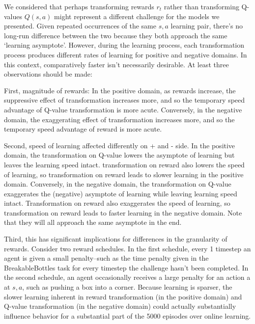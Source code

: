 
We considered that perhaps transforming rewards $r_t$ rather than transforming Q-values $Q(s, a)$ might represent a different challenge for the models we presented. Given repeated occurrences of the same $s, a$ learning pair, there's no long-run difference between the two because they both approach the same `learning asymptote'. However, during the learning process, each transformation process produces different rates of learning for positive and negative domains. In this context, comparatively faster isn't necessarily desirable. At least three observations should be made:

First, magnitude of rewards: In the positive domain, as rewards increase, the suppressive effect of transformation increases more, and so the temporary speed advantage of Q-value transformation is more acute. Conversely, in the negative domain, the exaggerating effect of transformation increases more, and so the temporary speed advantage of reward is more acute.

Second, speed of learning affected differently on + and - side. In the positive domain, the transformation on Q-value lowers the asymptote of learning but leaves the learning speed intact. transformation on reward also lowers the speed of learning, so transformation on reward leads to slower learning in the positive domain. Conversely, in the negative domain, the transformation on Q-value exaggerates the (negative) asymptote of learning while leaving learning speed intact. Transformation on reward also exaggerates the speed of learning, so transformation on reward leads to faster learning in the negative domain. Note that they will all approach the same asymptote in the end.

Third, this has significant implications for differences in the granularity of rewards. Consider two reward schedules. In the first schedule, every 1 timestep an agent is given a small penalty--such as the time penalty given in the BreakableBottles task for every timestep the challenge hasn't been completed. In the second schedule, an agent occasionally receives a large penalty for an action a at $s, a$, such as pushing a box into a corner. Because learning is sparser, the slower learning inherent in reward transformation (in the positive domain) and Q-value transformation (in the negative domain) could actually substantially influence behavior for a substantial part of the 5000 episodes over online learning.

